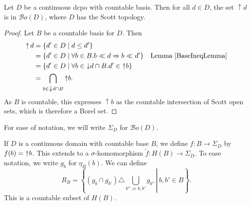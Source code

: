 \documentclass{lmcs}
\newcommand{\doubledownarrow}{\rotatebox[origin=c]{-90}{$\twoheadrightarrow$}}
\newcommand{\upset}{\mathop{\uparrow}}
\newcommand{\uu}{\rotatebox[origin=c]{90}{$\twoheadrightarrow$}}
\newcommand{\dd}{\doubledownarrow}
\newcommand{\Bo}{\ensuremath{\mathcal{B}o}} %
\begin{document}
\begin{lem}
\label{UpsetBorelLemma}
Let $D$ be a continuous dcpo with countable basis. Then for all $d \in D$, the set $\upset d$ is in $\Bo(D)$, where $D$ has the Scott topology. 
\end{lem}
\begin{proof}
Let $B$ be a countable basis for $D$. Then
\begin{align*}
\upset d &= \{ d' \in D \mid d \leq d' \} \\
 &= \{ d' \in D \mid \forall b \in B. b \ll d \Rightarrow b \ll d' \} & \text{Lemma \ref{BaseIneqLemma}} \\
 &= \{ d' \in D \mid \forall b \in \dd d \cap B . d' \in \uu b \} \\
 &= \bigcap_{b \in \dd d \cap B} \uu b.
\end{align*}
As $B$ is countable, this expresses $\upset b$ as the countable intersection of Scott open sets, which is therefore a Borel set. 
\end{proof}

For ease of notation, we will write $\Sigma_D$ for $\Bo(D)$. 

If $D$ is a continuous domain with countable base $B$, we define $f : B \rightarrow \Sigma_D$ by $f(b) = \uu b$. This extends to a $\sigma$-homomorphism $\tilde{f} : H(B) \rightarrow \Sigma_D$. To ease notation, we write $g_b$ for $\eta_B(b)$. We can define 
\[
R_B = \left\{ \left. (g_b \cap g_{b'}) \triangle \bigcup_{b'' \gg b,b'} g_{b''} \,\right| \, b,b' \in B \right\}.
\]
This is a countable subset of $H(B)$. 
\end{document}
